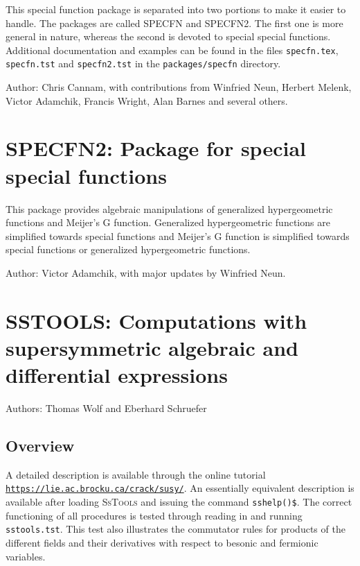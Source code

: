 This special function package is separated into two portions to make
it easier to handle.  The packages are called SPECFN and SPECFN2.  The
first one is more general in nature, whereas the second is devoted to
special special functions.  Additional documentation and examples can
be found in the files \texttt{specfn.tex}, \texttt{specfn.tst} and
\texttt{specfn2.tst} in the \texttt{packages/specfn} directory.

Author:  Chris Cannam, with contributions from Winfried Neun, Herbert
Melenk, Victor Adamchik, Francis Wright, Alan Barnes and several others.



\section{SPECFN2: Package for special special functions}


This package provides algebraic manipulations of generalized
hypergeometric functions and Meijer's G function.  Generalized
hypergeometric functions are simplified towards special functions and
Meijer's G function is simplified towards special functions or generalized
hypergeometric functions.

Author: Victor Adamchik, with major updates by Winfried Neun.



\newpage

\section{SSTOOLS: Computations with supersymmetric algebraic and differential
expressions}


Authors: Thomas Wolf and Eberhard Schruefer


\subsection{Overview}
A detailed description is available through the online tutorial \\
\texttt{\url{https://lie.ac.brocku.ca/crack/susy/}}. An essentially equivalent
description is available after loading \textsc{SsTools} and issuing the command
\texttt{sshelp()\$}. The correct functioning of all procedures is tested through
reading in and running \texttt{sstools.tst}. This test also illustrates
the commutator rules for products of the different fields and their
derivatives with respect to besonic and fermionic variables.

